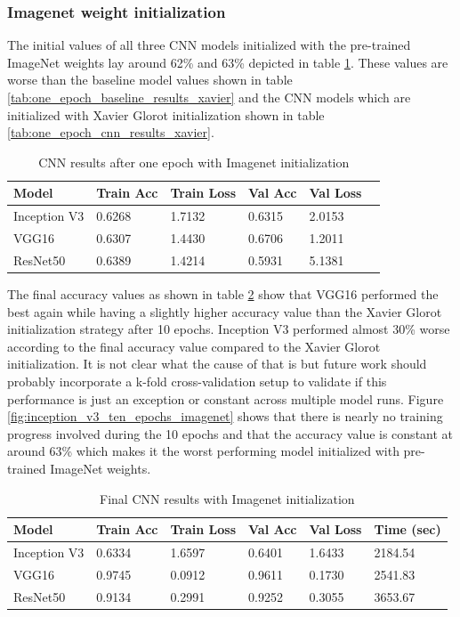 \documentclass{article}
\theoremstyle{definition}
\theoremstyle{remark}
\begin{document}
\subsubsection{Imagenet weight initialization}

The initial values of all three CNN models initialized with the pre-trained ImageNet weights lay around 62\% and 63\% depicted in table \ref{tab:one_epoch_cnn_results_imagenet}. These values are worse than the baseline model values shown in table \ref{tab:one_epoch_baseline_results_xavier} and the CNN models which are initialized with Xavier Glorot initialization shown in table \ref{tab:one_epoch_cnn_results_xavier}.


\begin{table}[h!]
\center
\begin{tabular}{|l|l|l|l|l|l|}
\hline
\textbf{Model} & \textbf{Train Acc} & \textbf{Train Loss} & \textbf{Val Acc} & \textbf{Val Loss}\\ \hline
Inception V3 & 0.6268  		 & 1.7132  	 & 0.6315	& 2.0153	\\ \hline
VGG16  		& 0.6307  	 	 & 1.4430    & 0.6706	&	1.2011 \\ \hline
ResNet50  	& 0.6389  	  	 & 1.4214  	 & 0.5931	&	5.1381\\ \hline
\end{tabular}
\caption{CNN results after one epoch with Imagenet initialization}
\label{tab:one_epoch_cnn_results_imagenet}
\end{table}

The final accuracy values as shown in table \ref{tab:final_cnn_results_imagenet} show that VGG16 performed the best again while having a slightly higher accuracy value than the Xavier Glorot initialization strategy after 10 epochs. Inception V3 performed almost 30\% worse according to the final accuracy value compared to the Xavier Glorot initialization. It is not clear what the cause of that is but future work should probably incorporate a k-fold cross-validation setup to validate if this performance is just an exception or constant across multiple model runs.
Figure \ref{fig:inception_v3_ten_epochs_imagenet} shows that there is nearly no training progress involved during the 10 epochs and that the accuracy value is constant at around 63\% which makes it the worst performing model initialized with pre-trained ImageNet weights.

\begin{table}[h!]
\center
\begin{tabular}{|l|l|l|l|l|l|}
\hline
\textbf{Model} & \textbf{Train Acc} & \textbf{Train Loss} & \textbf{Val Acc} & \textbf{Val Loss} & \textbf{Time (sec)}\\ \hline
 Inception V3	& 0.6334  & 1.6597  & 0.6401	& 1.6433 &	2184.54\\ \hline
 VGG16  		& 0.9745  	 	 & 0.0912      & 0.9611	  	  &	0.1730 	 & 2541.83\\ \hline     
 ResNet50  	& 0.9134  	  	& 0.2991  	   & 0.9252	 	  &	0.3055	 &  3653.67\\ \hline
\end{tabular}
\caption{Final CNN results with Imagenet initialization}
\label{tab:final_cnn_results_imagenet}
\end{table}
\end{document}
